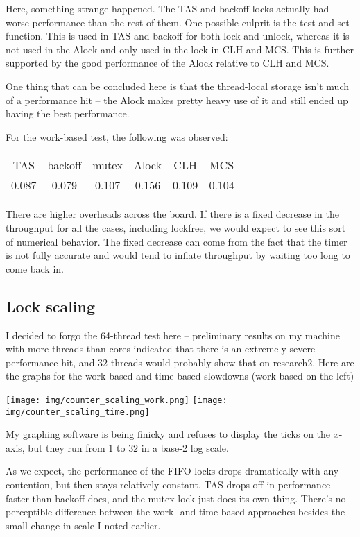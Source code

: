 \documentclass{article}
\begin{document}
Here, something strange happened. The TAS and backoff locks actually had worse performance than the rest of them. One possible culprit is the test-and-set function. This is used in TAS and backoff for both lock and unlock, whereas it is not used in the Alock and only used in the lock in CLH and MCS. This is further supported by the good performance of the Alock relative to CLH and MCS.

One thing that can be concluded here is that the thread-local storage isn't much of a performance hit -- the Alock makes pretty heavy use of it and still ended up having the best performance.

For the work-based test, the following was observed:

\begin{tabular}{c|c|c|c|c|c}
    TAS&backoff&mutex&Alock&CLH&MCS\\
    0.087& 0.079& 0.107& 0.156& 0.109& 0.104\\
\end{tabular}

There are higher overheads across the board. If there is a fixed decrease in the throughput for all the cases, including lockfree, we would expect to see this sort of numerical behavior. The fixed decrease can come from the fact that the timer is not fully accurate and would tend to inflate throughput by waiting too long to come back in.
\subsection*{Lock scaling}
I decided to forgo the 64-thread test here -- preliminary results on my machine with more threads than cores indicated that there is an extremely severe performance hit, and 32 threads would probably show that on research2. Here are the graphs for the work-based and time-based slowdowns (work-based on the left)

\texttt{[image: img/counter\_scaling\_work.png]}
\texttt{[image: img/counter\_scaling\_time.png]}

My graphing software is being finicky and refuses to display the ticks on the $x$-axis, but they run from $1$ to $32$ in a base-2 log scale. 

As we expect, the performance of the FIFO locks drops dramatically with any contention, but then stays relatively constant. TAS drops off in performance faster than backoff does, and the mutex lock just does its own thing. There's no perceptible difference between the work- and time-based approaches besides the small change in scale I noted earlier.
\end{document}
